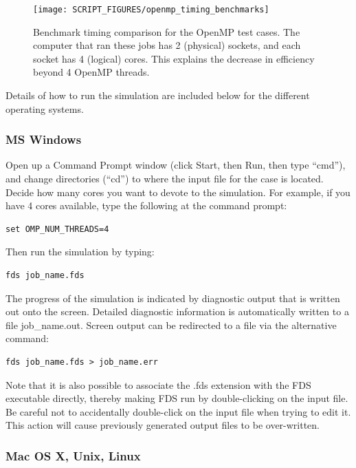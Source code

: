 \documentclass[11pt]{book}
\begin{document}
\begin{figure}[ht!]
\centering
\texttt{[image: SCRIPT\_FIGURES/openmp\_timing\_benchmarks]}
\caption[OpenMP timing study]{Benchmark timing comparison for the OpenMP test cases. The computer that ran these jobs has 2 (physical) sockets, and each socket has 4 (logical) cores. This explains the decrease in efficiency beyond 4 OpenMP threads.}
\label{fig:openmp_timing_benchmarks}
\end{figure}
Details of how to run the simulation are included below for the different operating systems. 

\subsubsection{MS Windows}

Open up a Command Prompt window (click Start, then Run, then type ``cmd''), and change directories (``cd'') to where the input file for the case is located. Decide how many cores you want to devote to the simulation. For example, if you have 4 cores available, type the following at the command prompt:
\begin{lstlisting}
set OMP_NUM_THREADS=4
\end{lstlisting}
Then run the simulation by typing:
\begin{lstlisting}
fds job_name.fds
\end{lstlisting}
The progress of the simulation is indicated by diagnostic output that is written out onto the screen. Detailed diagnostic information is automatically written to a file {\ct job\_name.out}. Screen output can be redirected to a file via the alternative command:
\begin{lstlisting}
fds job_name.fds > job_name.err
\end{lstlisting}
Note that it is also possible to associate the {\ct .fds} extension with the FDS executable directly, thereby making FDS run by double-clicking on the input file. Be careful not to accidentally double-click on the input file when trying to edit it. This action will cause previously generated output files to be over-written.

\subsubsection{Mac OS X, Unix, Linux}
\end{document}
